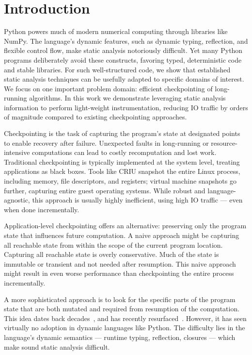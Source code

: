 \section{Introduction}
Python powers much of modern numerical computing through libraries like NumPy. The language’s dynamic features, such as dynamic typing, reflection, and flexible control flow, make static analysis notoriously difficult. Yet many Python programs deliberately avoid these constructs, favoring typed, deterministic code and stable libraries. For such well-structured code, we show that established static analysis techniques can be usefully adapted to specific domains of interest. We focus on one important problem domain: efficient checkpointing of long-running algorithms. 
In this work we demonstrate leveraging static analysis information to perform light-weight instrumentation, reducing IO traffic by orders of magnitude compared to existing checkpointing approaches.

Checkpointing is the task of capturing the program’s state at designated points to enable recovery after failure. Unexpected faults in long-running or resource-intensive computations can lead to costly recomputation and lost work. Traditional checkpointing is typically implemented at the system level, treating applications as black boxes. Tools like CRIU snapshot the entire Linux process, including memory, file descriptors, and registers; virtual machine snapshots go further, capturing entire guest operating systems. While robust and language-agnostic, this approach is usually highly inefficient, using high IO traffic --- even when done incrementally.

Application-level checkpointing offers an alternative: preserving only the program state that influences future computation. A naive approach might be capturing all reachable state from within the scope of the current program location. Capturing all reachable state is overly conservative. Much of the state is immutable or transient and not needed after resumption.  This naive approach might result in even worse performance than checkpointing the entire process incrementally.

A more sophisticated approach is to look for the specific parts of the program state that are both mutated and required from resumption of the computation. This idea dates back decades~\cite{li1990catch}, and has recently resurfaced~\cite{kim2024lact}. However, it has seen virtually no adoption in dynamic languages like Python. The difficulty lies in the language’s dynamic semantics --- runtime typing, reflection, closures --- which make sound static analysis difficult.

